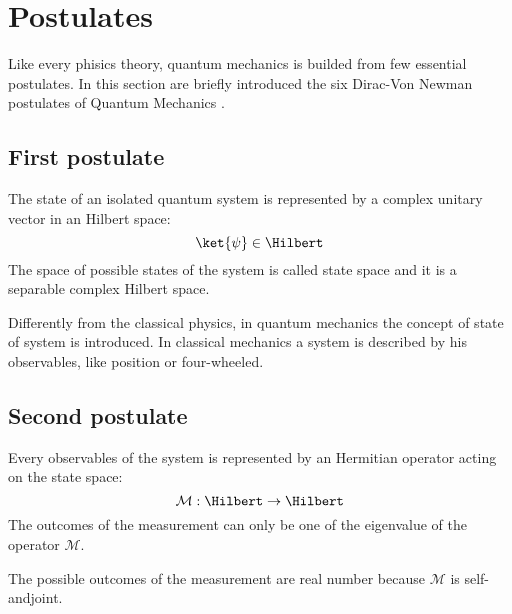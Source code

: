 \section{Postulates}
    Like every phisics theory, quantum mechanics is builded from few 
    essential postulates.
    In this section are briefly introduced the six Dirac-Von Newman 
    postulates of Quantum Mechanics \cite{quantumMec_Dirac}\cite{quantumMec_Neumann}.
    
    \subsection{First postulate}
    \begin{postulate}
        The state of an isolated quantum system is represented by a complex unitary 
        vector in an Hilbert space:
        \begin{equation*}
            \ket{\psi} \in \Hilbert
        \end{equation*}
        The space of possible states of the system is called state space and it is a
        separable complex Hilbert space.
        \label{post:1}
    \end{postulate}
    \begin{observation*}
        Differently from the classical physics, in quantum mechanics the concept
        of state of system is introduced. In classical mechanics a system is 
        described by his observables, like position or four-wheeled.
    \end{observation*}
    
    \subsection{Second postulate}
    \begin{postulate}[Observables]
        Every observables of the system is represented by an Hermitian operator
        acting on the state space:
        \begin{equation*}
            \mathcal{M}:\Hilbert\to\Hilbert
        \end{equation*}
        The outcomes of the measurement can only be one of the eigenvalue of the 
        operator $\mathcal{M}$.
        \label{post:2}
    \end{postulate}
    \begin{observation*}
        The possible outcomes of the measurement are real number because $\mathcal{M}$
        is self-andjoint. 
    \end{observation*}

